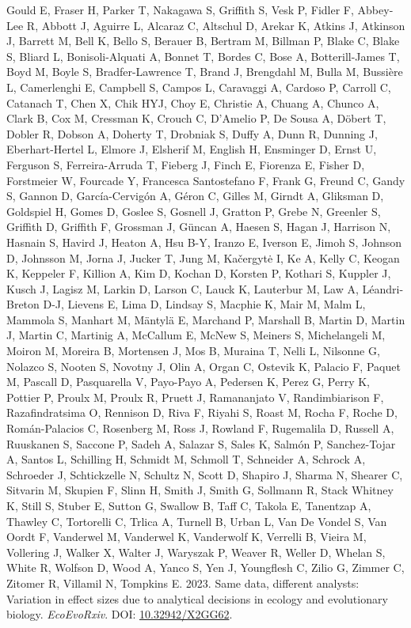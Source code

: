 \documentclass[10pt,a4paper]{article}
\newlength{\cslhangindent}
\newenvironment{CSLReferences}[2] %
 {\begin{list}{}{%
  \setlength{\itemindent}{0pt}
  \setlength{\leftmargin}{0pt}
  \setlength{\parsep}{0pt}
  \ifodd #1
   \setlength{\leftmargin}{\cslhangindent}
   \setlength{\itemindent}{-1\cslhangindent}
  \fi
  \setlength{\itemsep}{#2\baselineskip}}}
 {\end{list}}
\begin{document}
\begin{CSLReferences}{1}{0}
Gould E, Fraser H, Parker T, Nakagawa S, Griffith S, Vesk P, Fidler F, Abbey-Lee R, Abbott J, Aguirre L, Alcaraz C, Altschul D, Arekar K, Atkins J, Atkinson J, Barrett M, Bell K, Bello S, Berauer B, Bertram M, Billman P, Blake C, Blake S, Bliard L, Bonisoli-Alquati A, Bonnet T, Bordes C, Bose A, Botterill-James T, Boyd M, Boyle S, Bradfer-Lawrence T, Brand J, Brengdahl M, Bulla M, Bussière L, Camerlenghi E, Campbell S, Campos L, Caravaggi A, Cardoso P, Carroll C, Catanach T, Chen X, Chik HYJ, Choy E, Christie A, Chuang A, Chunco A, Clark B, Cox M, Cressman K, Crouch C, D'Amelio P, De Sousa A, Döbert T, Dobler R, Dobson A, Doherty T, Drobniak S, Duffy A, Dunn R, Dunning J, Eberhart-Hertel L, Elmore J, Elsherif M, English H, Ensminger D, Ernst U, Ferguson S, Ferreira-Arruda T, Fieberg J, Finch E, Fiorenza E, Fisher D, Forstmeier W, Fourcade Y, Francesca Santostefano F, Frank G, Freund C, Gandy S, Gannon D, García-Cervigón A, Géron C, Gilles M, Girndt A, Gliksman D, Goldspiel H, Gomes D, Goslee S, Gosnell J, Gratton P, Grebe N, Greenler S, Griffith D, Griffith F, Grossman J, Güncan A, Haesen S, Hagan J, Harrison N, Hasnain S, Havird J, Heaton A, Hsu B-Y, Iranzo E, Iverson E, Jimoh S, Johnson D, Johnsson M, Jorna J, Jucker T, Jung M, Kačergytė I, Ke A, Kelly C, Keogan K, Keppeler F, Killion A, Kim D, Kochan D, Korsten P, Kothari S, Kuppler J, Kusch J, Lagisz M, Larkin D, Larson C, Lauck K, Lauterbur M, Law A, Léandri-Breton D-J, Lievens E, Lima D, Lindsay S, Macphie K, Mair M, Malm L, Mammola S, Manhart M, Mäntylä E, Marchand P, Marshall B, Martin D, Martin J, Martin C, Martinig A, McCallum E, McNew S, Meiners S, Michelangeli M, Moiron M, Moreira B, Mortensen J, Mos B, Muraina T, Nelli L, Nilsonne G, Nolazco S, Nooten S, Novotny J, Olin A, Organ C, Ostevik K, Palacio F, Paquet M, Pascall D, Pasquarella V, Payo-Payo A, Pedersen K, Perez G, Perry K, Pottier P, Proulx M, Proulx R, Pruett J, Ramananjato V, Randimbiarison F, Razafindratsima O, Rennison D, Riva F, Riyahi S, Roast M, Rocha F, Roche D, Román-Palacios C, Rosenberg M, Ross J, Rowland F, Rugemalila D, Russell A, Ruuskanen S, Saccone P, Sadeh A, Salazar S, Sales K, Salmón P, Sanchez-Tojar A, Santos L, Schilling H, Schmidt M, Schmoll T, Schneider A, Schrock A, Schroeder J, Schtickzelle N, Schultz N, Scott D, Shapiro J, Sharma N, Shearer C, Sitvarin M, Skupien F, Slinn H, Smith J, Smith G, Sollmann R, Stack Whitney K, Still S, Stuber E, Sutton G, Swallow B, Taff C, Takola E, Tanentzap A, Thawley C, Tortorelli C, Trlica A, Turnell B, Urban L, Van De Vondel S, Van Oordt F, Vanderwel M, Vanderwel K, Vanderwolf K, Verrelli B, Vieira M, Vollering J, Walker X, Walter J, Waryszak P, Weaver R, Weller D, Whelan S, White R, Wolfson D, Wood A, Yanco S, Yen J, Youngflesh C, Zilio G, Zimmer C, Zitomer R, Villamil N, Tompkins E. 2023. Same data, different analysts: Variation in effect sizes due to analytical decisions in ecology and evolutionary biology. \emph{EcoEvoRxiv}. DOI: \href{https://doi.org/10.32942/X2GG62}{10.32942/X2GG62}.


\end{CSLReferences}
\end{document}
